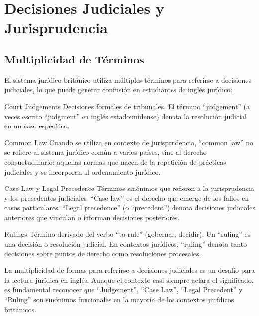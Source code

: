 \documentclass[12pt,oneside]{book}
\begin{document}
\section{Decisiones Judiciales y Jurisprudencia}

\subsection{Multiplicidad de Términos}

El sistema jurídico británico utiliza múltiples términos para referirse a decisiones judiciales, lo que puede generar confusión en estudiantes de inglés jurídico:

\begin{definition}{Court Judgements}
Decisiones formales de tribunales. El término ``judgement'' (a veces escrito ``judgment'' en inglés estadounidense) denota la resolución judicial en un caso específico.
\end{definition}

\begin{definition}{Common Law}
Cuando se utiliza en contexto de jurisprudencia, ``common law'' no se refiere al sistema jurídico común a varios países, sino al derecho consuetudinario: aquellas normas que nacen de la repetición de prácticas judiciales y se incorporan al ordenamiento jurídico.
\end{definition}

\begin{definition}{Case Law y Legal Precedence}
Términos sinónimos que refieren a la jurisprudencia y los precedentes judiciales. ``Case law'' es el derecho que emerge de los fallos en casos particulares. ``Legal precedence'' (o ``precedent'') denota decisiones judiciales anteriores que vinculan o informan decisiones posteriores.
\end{definition}

\begin{definition}{Rulings}
Término derivado del verbo ``to rule'' (gobernar, decidir). Un ``ruling'' es una decisión o resolución judicial. En contextos jurídicos, ``ruling'' denota tanto decisiones sobre puntos de derecho como resoluciones procesales.
\end{definition}

\begin{important}
La multiplicidad de formas para referirse a decisiones judiciales es un desafío para la lectura jurídica en inglés. Aunque el contexto casi siempre aclara el significado, es fundamental reconocer que ``Judgement'', ``Case Law'', ``Legal Precedent'' y ``Ruling'' son sinónimos funcionales en la mayoría de los contextos jurídicos británicos.
\end{important}
\end{document}
